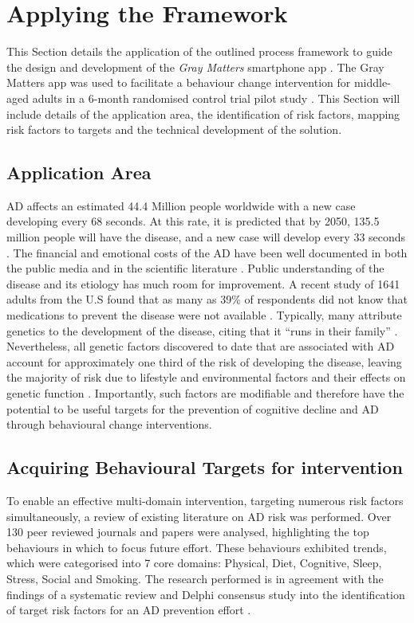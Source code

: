 \section{Applying the Framework}
This Section details the application of the outlined process framework to guide the design and development of the \textit{Gray Matters} smartphone app \cite{Hartin2014-IWAAL}. The Gray Matters app was used to facilitate a behaviour change intervention for middle-aged adults in a 6-month randomised control trial pilot study \cite{Norton2015-TRCI}. This Section will include details of the application area, the identification of risk factors, mapping risk factors to targets and the technical development of the solution.

\subsection{Application Area}
AD affects an estimated 44.4 Million people worldwide with a new case developing every 68 seconds. At this rate, it is predicted that by 2050, 135.5 million people will have the disease, and a new case will develop every 33 seconds \cite{Thies2013}. The financial and emotional costs of the AD have been well documented in both the public media and in the scientific literature \cite{Alz2010, Hurd2013}. Public understanding of the disease and its etiology has much room for improvement. A recent study of 1641 adults from the U.S found that as many as 39\% of respondents did not know that medications to prevent the disease were not available \cite{Roberts2014}. Typically, many attribute genetics to the development of the disease, citing that it ``runs in their family'' \cite{Lock2006, Roberts2014}. Nevertheless, all genetic factors discovered to date that are associated with AD account for approximately one third of the risk of developing the disease, leaving the majority of risk due to lifestyle and environmental factors and their effects on genetic function \cite{Ridge2013}. Importantly, such factors are modifiable and therefore have the potential to be useful targets for the prevention of cognitive decline and AD through behavioural change interventions.

\subsection{Acquiring Behavioural Targets for intervention} \label{section-acquiring-targets}
To enable an effective multi-domain intervention, targeting numerous risk factors simultaneously, a review of existing literature on AD risk was performed. Over 130 peer reviewed journals and papers were analysed, highlighting the top behaviours in which to focus future effort. These behaviours exhibited trends, which were categorised into 7 core domains: Physical, Diet, Cognitive, Sleep, Stress, Social and Smoking. The research performed is in agreement with the findings of a systematic review and Delphi consensus study into the identification of target risk factors for an AD prevention effort \cite{Deckers2015}.

